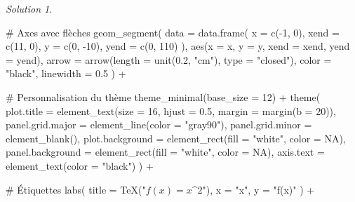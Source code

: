 \documentclass[
  12pt,
  letterpaper,
]{book}
\newenvironment{Shaded}{}{}
\newcommand{\AttributeTok}[1]{\textcolor[rgb]{0.84,0.23,0.29}{#1}}
\newcommand{\CommentTok}[1]{\textcolor[rgb]{0.42,0.45,0.49}{#1}}
\newcommand{\ConstantTok}[1]{\textcolor[rgb]{0.00,0.36,0.77}{#1}}
\newcommand{\DecValTok}[1]{\textcolor[rgb]{0.00,0.36,0.77}{#1}}
\newcommand{\FloatTok}[1]{\textcolor[rgb]{0.00,0.36,0.77}{#1}}
\newcommand{\FunctionTok}[1]{\textcolor[rgb]{0.44,0.26,0.76}{#1}}
\newcommand{\NormalTok}[1]{\textcolor[rgb]{0.14,0.16,0.18}{#1}}
\newcommand{\SpecialCharTok}[1]{\textcolor[rgb]{0.00,0.36,0.77}{#1}}
\newcommand{\StringTok}[1]{\textcolor[rgb]{0.01,0.18,0.38}{#1}}
\theoremstyle{remark}
\newtheorem*{solution}{Solution}
\begin{document}
\begin{solution}
\begin{Shaded}
\begin{Highlighting}[]
  \CommentTok{\# Axes avec flèches}
  \FunctionTok{geom\_segment}\NormalTok{(}
    \AttributeTok{data =} \FunctionTok{data.frame}\NormalTok{(}
      \AttributeTok{x =} \FunctionTok{c}\NormalTok{(}\SpecialCharTok{{-}}\DecValTok{1}\NormalTok{, }\DecValTok{0}\NormalTok{), }
      \AttributeTok{xend =} \FunctionTok{c}\NormalTok{(}\DecValTok{11}\NormalTok{, }\DecValTok{0}\NormalTok{),}
      \AttributeTok{y =} \FunctionTok{c}\NormalTok{(}\DecValTok{0}\NormalTok{, }\SpecialCharTok{{-}}\DecValTok{10}\NormalTok{), }
      \AttributeTok{yend =} \FunctionTok{c}\NormalTok{(}\DecValTok{0}\NormalTok{, }\DecValTok{110}\NormalTok{)}
\NormalTok{    ),}
    \FunctionTok{aes}\NormalTok{(}\AttributeTok{x =}\NormalTok{ x, }\AttributeTok{y =}\NormalTok{ y, }\AttributeTok{xend =}\NormalTok{ xend, }\AttributeTok{yend =}\NormalTok{ yend),}
    \AttributeTok{arrow =} \FunctionTok{arrow}\NormalTok{(}\AttributeTok{length =} \FunctionTok{unit}\NormalTok{(}\FloatTok{0.2}\NormalTok{, }\StringTok{"cm"}\NormalTok{), }\AttributeTok{type =} \StringTok{"closed"}\NormalTok{),}
    \AttributeTok{color =} \StringTok{"black"}\NormalTok{,}
    \AttributeTok{linewidth =} \FloatTok{0.5}
\NormalTok{  ) }\SpecialCharTok{+}
  
  \CommentTok{\# Personnalisation du thème}
  \FunctionTok{theme\_minimal}\NormalTok{(}\AttributeTok{base\_size =} \DecValTok{12}\NormalTok{) }\SpecialCharTok{+}
  \FunctionTok{theme}\NormalTok{(}
    \AttributeTok{plot.title =} \FunctionTok{element\_text}\NormalTok{(}\AttributeTok{size =} \DecValTok{16}\NormalTok{, }\AttributeTok{hjust =} \FloatTok{0.5}\NormalTok{, }\AttributeTok{margin =} \FunctionTok{margin}\NormalTok{(}\AttributeTok{b =} \DecValTok{20}\NormalTok{)),}
    \AttributeTok{panel.grid.major =} \FunctionTok{element\_line}\NormalTok{(}\AttributeTok{color =} \StringTok{"gray90"}\NormalTok{),}
    \AttributeTok{panel.grid.minor =} \FunctionTok{element\_blank}\NormalTok{(),}
    \AttributeTok{plot.background =} \FunctionTok{element\_rect}\NormalTok{(}\AttributeTok{fill =} \StringTok{"white"}\NormalTok{, }\AttributeTok{color =} \ConstantTok{NA}\NormalTok{),}
    \AttributeTok{panel.background =} \FunctionTok{element\_rect}\NormalTok{(}\AttributeTok{fill =} \StringTok{"white"}\NormalTok{, }\AttributeTok{color =} \ConstantTok{NA}\NormalTok{),}
    \AttributeTok{axis.text =} \FunctionTok{element\_text}\NormalTok{(}\AttributeTok{color =} \StringTok{"black"}\NormalTok{)}
\NormalTok{  ) }\SpecialCharTok{+}
  
  \CommentTok{\# Étiquettes}
  \FunctionTok{labs}\NormalTok{(}
    \AttributeTok{title =} \FunctionTok{TeX}\NormalTok{(}\StringTok{"$f(x) = x\^{}2$"}\NormalTok{),}
    \AttributeTok{x =} \StringTok{"x"}\NormalTok{,}
    \AttributeTok{y =} \StringTok{"f(x)"}
\NormalTok{  ) }\SpecialCharTok{+}
  

\end{Highlighting}
\end{Shaded}
\end{solution}
\end{document}
